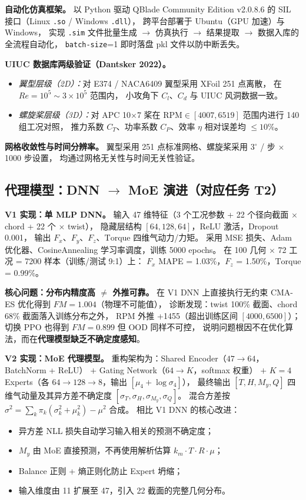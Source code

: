 \textbf{自动化仿真框架。}
以 Python 驱动 QBlade Community Edition v2.0.8.6 的 SIL 接口（Linux \texttt{.so} / Windows \texttt{.dll}），
跨平台部署于 Ubuntu（GPU 加速）与 Windows，
实现 \texttt{.sim} 文件批量生成 $\rightarrow$ 仿真执行 $\rightarrow$ 结果提取 $\rightarrow$ 数据入库的全流程自动化，
\texttt{batch-size}=1 即时落盘 pkl 文件以防中断丢失。

\textbf{UIUC 数据库两级验证（Dantsker 2022）。}
\begin{itemize}
  \item \emph{翼型层级（2D）：}对 E374 / NACA6409 翼型采用 XFoil 251 点离散，
        在 $Re=10^5 \sim 3\times 10^5$ 范围内，
        小攻角下 $C_l$、$C_d$ 与 UIUC 风洞数据一致。
  \item \emph{螺旋桨层级（3D）：}对 APC 10$\times$7 桨在 $\text{RPM}\in[4007, 6519]$ 范围内进行 140 组工况对照，
        推力系数 $C_T$、功率系数 $C_P$、效率 $\eta$ 相对误差均 $\leq 10\%$。
\end{itemize}

\textbf{网格收敛性与时间分辨率。}
翼型采用 251 点标准网格、螺旋桨采用 3$^\circ$ / 步 $\times$ 1000 步设置，
均通过网格无关性与时间无关性验证。

\subsection{代理模型：DNN $\rightarrow$ MoE 演进（对应任务 T2）}

\textbf{V1 实现：单 MLP DNN。}
输入 47 维特征（3 个工况参数 + 22 个径向截面 $\times$ chord + 22 个 $\times$ twist），
隐藏层结构 $[64, 128, 64]$，ReLU 激活，Dropout 0.001，
输出 $F_x$、$F_y$、$F_z$、$\text{Torque}$ 四维气动力/力矩。
采用 MSE 损失、Adam 优化器、CosineAnnealing 学习率调度，训练 5000 epochs。
在 100 几何 $\times$ 72 工况 = 7200 样本（训练/测试 9:1）上：
$F_x$ MAPE = 1.03\%，$F_z$ = 1.50\%，$\text{Torque}$ = 0.99\%。

\textbf{核心问题：分布内精度高 $\neq$ 外推可靠。}
在 V1 DNN 上直接执行无约束 CMA-ES 优化得到 $FM=1.004$（物理不可能值），
诊断发现：twist 100\% 截面、chord 68\% 截面落入训练分布之外，
RPM 外推 +1455（超出训练区间 $[4000, 6500]$）；
切换 PPO 也得到 $FM=0.899$ 但 OOD 同样不可控，
说明问题根因不在优化算法，而在\textbf{代理模型缺乏不确定度感知}。

\textbf{V2 实现：MoE 代理模型。}
重构架构为：Shared Encoder（$47 \rightarrow 64$，BatchNorm + ReLU）
$+$ Gating Network（$64 \rightarrow K$，softmax 权重）
$+$ $K=4$ Experts（各 $64 \rightarrow 128 \rightarrow 8$，输出 $[\mu_4 + \log\sigma_4]$），
最终输出 $[T, H, M_y, Q]$ 四维气动量及其异方差不确定度 $[\sigma_T, \sigma_H, \sigma_{M_y}, \sigma_Q]$。
混合方差按 $\sigma^2 = \sum_k \pi_k (\sigma_k^2 + \mu_k^2) - \mu^2$ 合成。
相比 V1 DNN 的核心改进：
\begin{itemize}
  \item 异方差 NLL 损失自动学习输入相关的预测不确定度；
  \item $M_y$ 由 MoE 直接预测，不再使用解析估算 $k_m \cdot T \cdot R \cdot \mu$；
  \item Balance 正则 + 熵正则化防止 Expert 坍缩；
  \item 输入维度由 11 扩展至 47，引入 22 截面的完整几何分布。
\end{itemize}

